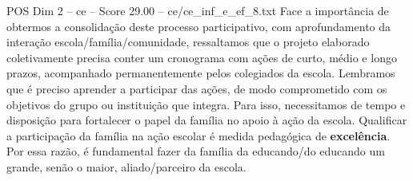 \begin{textsample}{POS Dim 2 – ce – Score 29.00 – ce/ce\_inf\_e\_ef\_8.txt}
Face a importância de obtermos a consolidação deste processo participativo, com aprofundamento da interação escola/família/comunidade, ressaltamos que o projeto elaborado coletivamente precisa conter um cronograma com ações de curto, médio e longo prazos, acompanhado permanentemente pelos colegiados da escola.
Lembramos que é preciso aprender a participar das ações, de modo comprometido com os objetivos do grupo ou instituição que integra.
Para isso, necessitamos de tempo e disposição para fortalecer o papel da família no apoio à ação da escola.
Qualificar a participação da família na ação escolar é medida pedagógica de \textbf{excelência}.
Por essa razão, é fundamental fazer da família da educando/do educando um grande, senão o maior, aliado/parceiro da escola.

\end{textsample}
